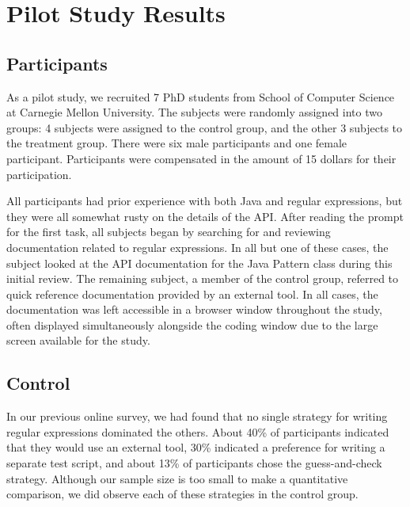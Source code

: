 \documentclass[10pt, conference, compsocconf]{IEEEtran}
\begin{document}

\section{Pilot Study Results}

\subsection{Participants}

As a pilot study, we recruited 7 PhD students from School of Computer Science at Carnegie Mellon University. The subjects were randomly assigned into two groups: 4 subjects were assigned to the control group, and the other 3 subjects to the treatment group. There were six male participants and one female participant. Participants were compensated in the amount of 15 dollars for their participation.

All participants had prior experience with both Java and regular expressions, but they were all somewhat rusty on the details of the API. After reading the prompt for the first task, all subjects began by searching for and reviewing documentation related to regular expressions. In all but one of these cases, the subject looked at the API documentation for the Java Pattern class during this initial review. The remaining subject, a member of the control group, referred to quick reference documentation provided by an external tool. In all cases, the documentation was left accessible in a browser window throughout the study, often displayed simultaneously alongside the coding window due to the large screen available for the study.

\subsection{Control}
In our previous online survey, we had found that no single strategy for writing regular expressions dominated the others. About 40\% of participants indicated that they would use an external tool, 30\% indicated a preference for writing a separate test script, and about 13\% of participants chose the guess-and-check strategy. Although our sample size is too small to make a quantitative comparison, we did observe each of these strategies in the control group. 
\end{document}
